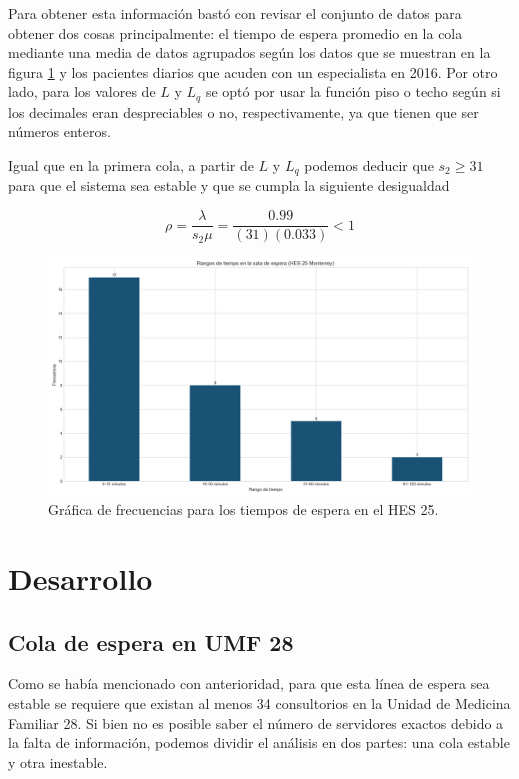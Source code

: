 \documentclass[10pt]{article}
\begin{document}
    Para obtener esta información bastó con revisar el conjunto de datos para obtener dos cosas principalmente: el tiempo de espera promedio en la cola mediante una media de datos agrupados según los datos que se muestran en la figura \ref{fig:frec_espera_hes25} y los pacientes diarios que acuden con un especialista en 2016. Por otro lado, para los valores de $L$ y $L_{q}$ se optó por usar la función piso o techo según si los decimales eran despreciables o no, respectivamente, ya que tienen que ser números enteros.
    
    Igual que en la primera cola, a partir de $L$ y $L_{q}$ podemos deducir que $s_{2} \geq 31$ para que el sistema sea estable y que se cumpla la siguiente desigualdad
    
    \begin{equation*}
    	\rho = \frac{\lambda}{s_{2}\mu} = \frac{0.99}{(31)(0.033)} < 1
    \end{equation*}
    
    \begin{figure}[h]
    	\centering
    	\includegraphics[width=130mm]{./images/rangos-tiempo-espera-hes25.png}
    	\caption{Gráfica de frecuencias para los tiempos de espera en el HES 25.}
    	\label{fig:frec_espera_hes25}
    \end{figure}
    
    \newpage
    
    \section{Desarrollo} \label{sec:desarrollo}
    \subsection{Cola de espera en UMF 28}
    Como se había mencionado con anterioridad, para que esta línea de espera sea estable se requiere que existan al menos 34 consultorios en la Unidad de Medicina Familiar 28. Si bien no es posible saber el número de servidores exactos debido a la falta de información, podemos dividir el análisis en dos partes: una cola estable y otra inestable.
    
\end{document}
